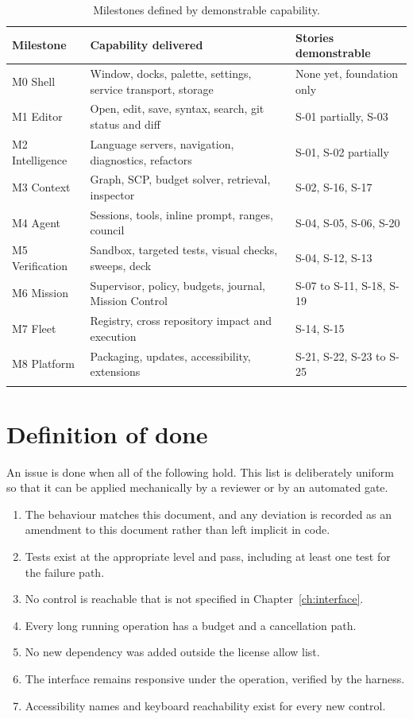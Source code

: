 \begin{longtable}{@{}p{} p{} p{}@{}}
\toprule
\textbf{Milestone} & \textbf{Capability delivered} & \textbf{Stories demonstrable} \\
\midrule
\endhead
M0 Shell & Window, docks, palette, settings, service transport, storage & None yet, foundation only \\
M1 Editor & Open, edit, save, syntax, search, git status and diff & S-01 partially, S-03 \\
M2 Intelligence & Language servers, navigation, diagnostics, refactors & S-01, S-02 partially \\
M3 Context & Graph, SCP, budget solver, retrieval, inspector & S-02, S-16, S-17 \\
M4 Agent & Sessions, tools, inline prompt, ranges, council & S-04, S-05, S-06, S-20 \\
M5 Verification & Sandbox, targeted tests, visual checks, sweeps, deck & S-04, S-12, S-13 \\
M6 Mission & Supervisor, policy, budgets, journal, Mission Control & S-07 to S-11, S-18, S-19 \\
M7 Fleet & Registry, cross repository impact and execution & S-14, S-15 \\
M8 Platform & Packaging, updates, accessibility, extensions & S-21, S-22, S-23 to S-25 \\
\bottomrule
\caption{Milestones defined by demonstrable capability.}
\end{longtable}

\section{Definition of done}

An issue is done when all of the following hold. This list is deliberately uniform so that it
can be applied mechanically by a reviewer or by an automated gate.

\begin{enumerate}
  \item The behaviour matches this document, and any deviation is recorded as an amendment
  to this document rather than left implicit in code.
  \item Tests exist at the appropriate level and pass, including at least one test for the
  failure path.
  \item No control is reachable that is not specified in Chapter~\ref{ch:interface}.
  \item Every long running operation has a budget and a cancellation path.
  \item No new dependency was added outside the license allow list.
  \item The interface remains responsive under the operation, verified by the harness.
  \item Accessibility names and keyboard reachability exist for every new control.
\end{enumerate}
